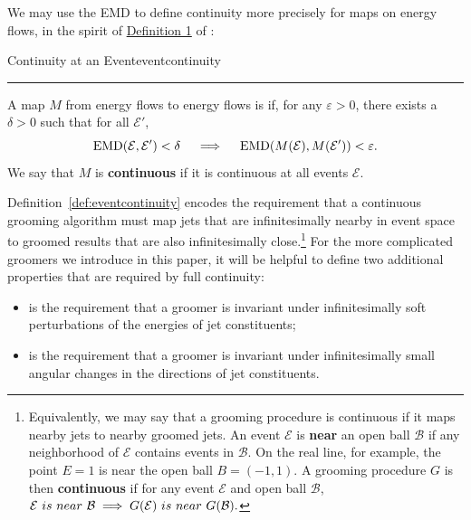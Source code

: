 We may use the EMD to define continuity more precisely for maps on energy flows, in the spirit of \href{https://arxiv.org/pdf/2004.04159.pdf#page=5\&zoom=100,0,350}{Definition 1} of :
%
\begin{definitionbox}{Continuity at an Event}{eventcontinuity}
    \emph{}

    \vspace{7pt}
    \hrule
    \vspace{7pt}

    A map \(M\) from energy flows to energy flows is  if, for any \(\varepsilon > 0\), there exists a \(\delta > 0\) such that for all \(\mathcal E'\),
    \begin{equation*}\label{eq:emdcontinuity}
        {\rm EMD}(\mathcal E,\mathcal E')<\delta
        \quad\implies\quad
        {\rm EMD}(M(\mathcal E), M(\mathcal E')) < \varepsilon.
    \end{equation*}
    We say that \(M\) is \textbf{continuous} if it is continuous at all events \(\mathcal{E}\).
\end{definitionbox}
%
\noindent Definition~\ref{def:eventcontinuity} encodes the requirement that a continuous grooming algorithm must map jets that are infinitesimally nearby in event space to groomed results that are also infinitesimally close.\footnote{
Equivalently, we may say that a grooming procedure is continuous if it maps nearby jets to nearby groomed jets.
%
An event \(\mathcal{E}\) is \textbf{near} an open ball \(\mathcal{B}\) if any neighborhood of \(\mathcal{E}\) contains events in \(\mathcal{B}\).
%
On the real line, for example, the point \(E = 1\) is near the open ball \(B = (-1, 1)\).
%
A grooming procedure \(G\) is then \textbf{continuous} if for any event \(\mathcal{E}\) and open ball \(\mathcal{B}\),
    \(
    \mathcal{E} {\text ~is~ near~} \mathcal{B}
    \implies
    G(\mathcal{E}) {\text~ is~ near~} G(\mathcal{B}).
    \)
}
For the more complicated \PIRANHA{} groomers we introduce in this paper, it will be helpful to define two additional properties that are required by full continuity:
\begin{itemize}
    \item
         is the requirement that a groomer is invariant under infinitesimally soft perturbations of the energies of jet constituents;

    \item
         is the requirement that a groomer is invariant under infinitesimally small angular changes in the directions of jet constituents.
\end{itemize}

